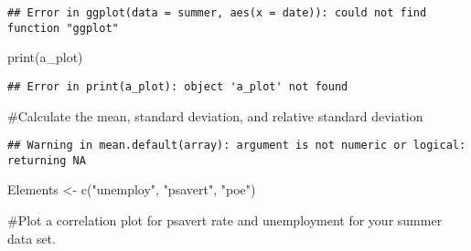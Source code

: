 \documentclass[
]{article}
\newenvironment{Shaded}{\begin{snugshade}}{\end{snugshade}}
\newcommand{\FunctionTok}[1]{\textcolor[rgb]{0.00,0.00,0.00}{#1}}
\newcommand{\NormalTok}[1]{#1}
\newcommand{\OtherTok}[1]{\textcolor[rgb]{0.56,0.35,0.01}{#1}}
\newcommand{\SpecialCharTok}[1]{\textcolor[rgb]{0.00,0.00,0.00}{#1}}
\newcommand{\StringTok}[1]{\textcolor[rgb]{0.31,0.60,0.02}{#1}}
\begin{document}
\begin{verbatim}
## Error in ggplot(data = summer, aes(x = date)): could not find function "ggplot"
\end{verbatim}

\begin{Shaded}
\begin{Highlighting}[]
\FunctionTok{print}\NormalTok{(a\_plot)}
\end{Highlighting}
\end{Shaded}

\begin{verbatim}
## Error in print(a_plot): object 'a_plot' not found
\end{verbatim}

\#Calculate the mean, standard deviation, and relative standard
deviation

\begin{Shaded}
\end{Shaded}

\begin{verbatim}
## Warning in mean.default(array): argument is not numeric or logical: returning NA
\end{verbatim}

\begin{Shaded}
\begin{Highlighting}[]
\NormalTok{Elements }\OtherTok{\textless{}{-}} \FunctionTok{c}\NormalTok{(}\StringTok{"unemploy"}\NormalTok{, }\StringTok{"psavert"}\NormalTok{, }\StringTok{"poe"}\NormalTok{)}
\end{Highlighting}
\end{Shaded}

\#Plot a correlation plot for psavert rate and unemployment for your
summer data set.
\end{document}
